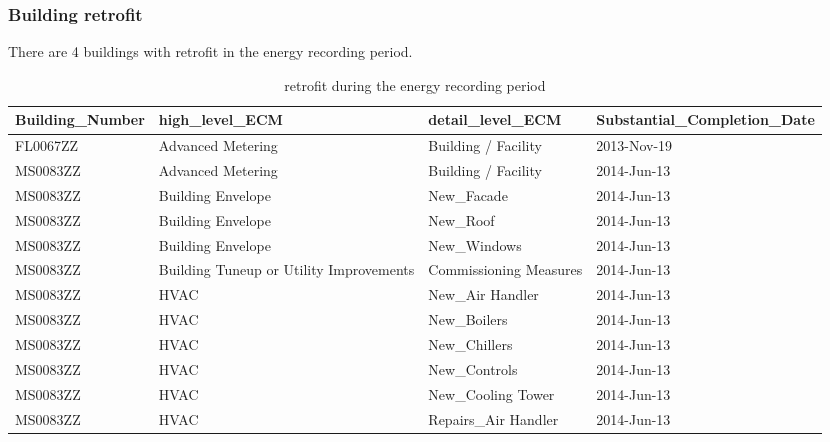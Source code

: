 \documentclass[12pt]{article}
\begin{document}
\subsubsection{Building retrofit}
There are 4 buildings with retrofit in the energy recording period.
\begin{longtable}{lp{4cm}p{4cm}p{3cm}}
\caption{retrofit during the energy recording period}\\
\label{tab:wretro}
Building\_Number & high\_level\_ECM & detail\_level\_ECM & Substantial\_Completion\_Date \\ \hline \hline
\endhead
FL0067ZZ         & Advanced Metering                       & Building / Facility                       & 2013-Nov-19           \\
MS0083ZZ         & Advanced Metering                       & Building / Facility                       & 2014-Jun-13           \\
MS0083ZZ         & Building Envelope                       & New\_Facade                               & 2014-Jun-13           \\
MS0083ZZ         & Building Envelope                       & New\_Roof                                 & 2014-Jun-13           \\
MS0083ZZ         & Building Envelope                       & New\_Windows                              & 2014-Jun-13           \\
MS0083ZZ         & Building Tuneup or Utility Improvements & Commissioning Measures                    & 2014-Jun-13           \\
MS0083ZZ         & HVAC                                    & New\_Air Handler                          & 2014-Jun-13           \\
MS0083ZZ         & HVAC                                    & New\_Boilers                              & 2014-Jun-13           \\
MS0083ZZ         & HVAC                                    & New\_Chillers                             & 2014-Jun-13           \\
MS0083ZZ         & HVAC                                    & New\_Controls                             & 2014-Jun-13           \\
MS0083ZZ         & HVAC                                    & New\_Cooling Tower                        & 2014-Jun-13           \\
MS0083ZZ         & HVAC                                    & Repairs\_Air Handler                      & 2014-Jun-13           \\

\end{longtable}
\end{document}
